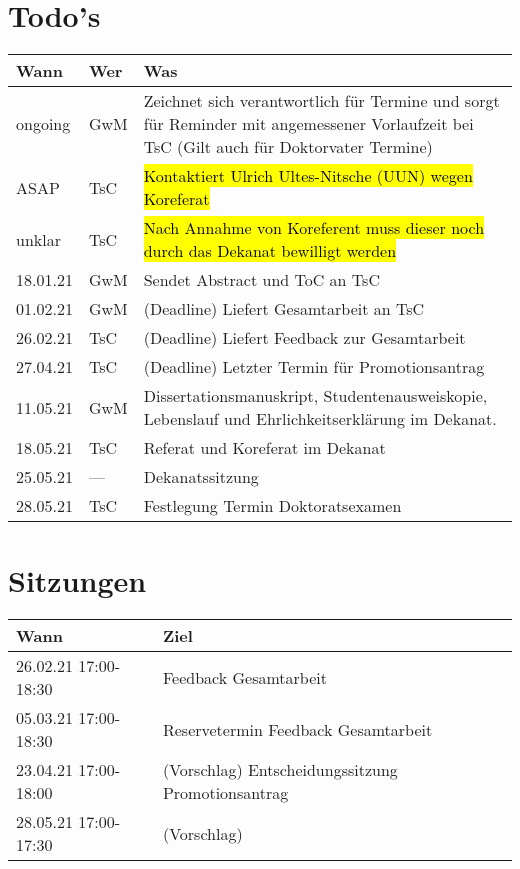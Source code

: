 \documentclass[a4paper,10pt,english]{extarticle}
\begin{document}
\section{Todo's}
\begin{tabular}{|l|l|l|}\hline
	Wann & Wer & Was \\\hline
	ongoing & GwM & Zeichnet sich verantwortlich für Termine und sorgt für Reminder mit angemessener Vorlaufzeit bei TsC (Gilt auch für Doktorvater Termine)\\
	ASAP    & TsC & \hl{Kontaktiert Ulrich Ultes-Nitsche (UUN) wegen Koreferat}\\
	unklar  & TsC & \hl{Nach Annahme von Koreferent muss dieser noch durch das Dekanat bewilligt werden}\\
	18.01.21& GwM & Sendet Abstract und ToC an TsC\\
	01.02.21& GwM & (Deadline) Liefert Gesamtarbeit an TsC\\
	26.02.21& TsC & (Deadline) Liefert Feedback zur Gesamtarbeit\\
	27.04.21& TsC & (Deadline) Letzter Termin für Promotionsantrag\\
	11.05.21& GwM & Dissertationsmanuskript, Studentenausweiskopie, Lebenslauf und Ehrlichkeitserklärung im Dekanat.\\
	18.05.21& TsC & Referat und Koreferat im Dekanat\\
	25.05.21& --- & Dekanatssitzung\\
	28.05.21& TsC & Festlegung Termin Doktoratsexamen \\\hline
\end{tabular}

\section{Sitzungen}
\begin{tabular}{|l|l|}\hline
	Wann & Ziel \\\hline
	26.02.21 17:00-18:30 & Feedback Gesamtarbeit \\
	05.03.21 17:00-18:30 & Reservetermin Feedback Gesamtarbeit\\
	23.04.21 17:00-18:00 & (Vorschlag) Entscheidungssitzung Promotionsantrag\\
	28.05.21 17:00-17:30 & (Vorschlag)\\
	\hline
\end{tabular}
\end{document}
